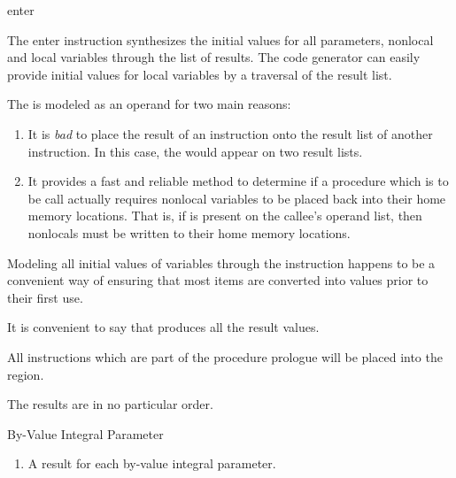 \begin{instruction}{enter}

  \begin{notes}
    The enter instruction synthesizes the initial values for all
    parameters, nonlocal and local variables through the list of
    results.  The code generator can easily provide initial values for
    local variables by a traversal of the result list.

    The  is modeled as an operand for two main
    reasons:
    \begin{enumerate}
    \item It is \emph{bad} to place the result of an instruction onto
      the result list of another instruction.  In this case, the
       would appear on two result lists.
    \item It provides a fast and reliable method to determine if a
      procedure which is to be call actually requires nonlocal
      variables to be placed back into their home memory locations.
      That is, if  is present on the callee's
       operand list, then nonlocals must be written to
      their home memory locations.
    \end{enumerate}

    Modeling all initial values of variables through the
     instruction happens to be a convenient way of
    ensuring that most  items are converted into
     values prior to their first use.

    It is convenient to say that  produces all the
    result values.

    All instructions which are part of the procedure prologue will be
    placed into the  region.

    The results are in no particular order.
  \end{notes}

  \begin{results}
  \item By-Value Integral Parameter
    \begin{enumerate}
    \item A result for each by-value integral parameter.
    \end{enumerate}


\end{results}
\end{instruction}
